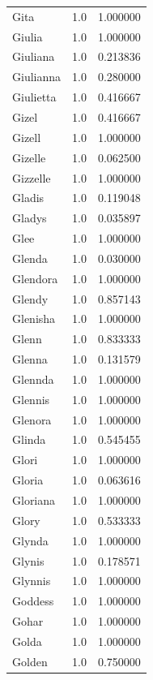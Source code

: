 \documentclass[
  letterpaper,
  DIV=11,
  numbers=noendperiod]{scrreprt}
\begin{document}
\begin{tabular}{lrr}
Gita            &   1.0 &   1.000000 \\
Giulia          &   1.0 &   1.000000 \\
Giuliana        &   1.0 &   0.213836 \\
Giulianna       &   1.0 &   0.280000 \\
Giulietta       &   1.0 &   0.416667 \\
Gizel           &   1.0 &   0.416667 \\
Gizell          &   1.0 &   1.000000 \\
Gizelle         &   1.0 &   0.062500 \\
Gizzelle        &   1.0 &   1.000000 \\
Gladis          &   1.0 &   0.119048 \\
Gladys          &   1.0 &   0.035897 \\
Glee            &   1.0 &   1.000000 \\
Glenda          &   1.0 &   0.030000 \\
Glendora        &   1.0 &   1.000000 \\
Glendy          &   1.0 &   0.857143 \\
Glenisha        &   1.0 &   1.000000 \\
Glenn           &   1.0 &   0.833333 \\
Glenna          &   1.0 &   0.131579 \\
Glennda         &   1.0 &   1.000000 \\
Glennis         &   1.0 &   1.000000 \\
Glenora         &   1.0 &   1.000000 \\
Glinda          &   1.0 &   0.545455 \\
Glori           &   1.0 &   1.000000 \\
Gloria          &   1.0 &   0.063616 \\
Gloriana        &   1.0 &   1.000000 \\
Glory           &   1.0 &   0.533333 \\
Glynda          &   1.0 &   1.000000 \\
Glynis          &   1.0 &   0.178571 \\
Glynnis         &   1.0 &   1.000000 \\
Goddess         &   1.0 &   1.000000 \\
Gohar           &   1.0 &   1.000000 \\
Golda           &   1.0 &   1.000000 \\
Golden          &   1.0 &   0.750000 \\

\end{tabular}
\end{document}
